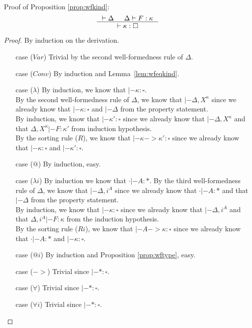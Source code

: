 \paragraph{}
Proof of Proposition \ref{prop:wfkind}:
\[ \inference{ |- \Delta & \Delta |- F : \kappa}{ |- \kappa:\square }
\]
\begin{proof} By induction on the derivation.
\begin{itemize}
\item[case] ($Var$)
	Trivial by the second well-formedness rule of $\Delta$.
\item[case] ($Conv$)
	By induction and Lemma~\ref{lem:wfeqkind}.
\item[case] ($\lambda$)
	By induction, we know that $|- \kappa:\square$.\\
	By the second well-formedness rule of $\Delta$,
	we know that $|- \Delta,X^\kappa$ since we already know
	that $|- \kappa:\square$ and $|- \Delta$ from the property statement.\\
	By induction, we know that $|- \kappa':\square$
	since we already know that $|- \Delta,X^\kappa$ and
	that $\Delta,X^\kappa|- F:\kappa'$ from induction hypothesis.\\
	By the sorting rule ($R$), we know that $|- \kappa -> \kappa':\square$
	since we already know that $|- \kappa:\square$ and $|- \kappa':\square$.
\item[case] ($@$)
	By induction, easy.
\item[case] ($\lambda i$)
	By induction we know that $\cdot|- A:*$.
	By the third well-formedness rule of $\Delta$, we know that
	$|- \Delta,i^A$ since we already know that $\cdot|- A:*$ and
	that $|- \Delta$ from the property statement.\\
	By induction, we know that $|- \kappa:\square$
	since we already know that $|- \Delta,i^A$ and
	that $\Delta,i^A|- F:\kappa$ from the induction hypothesis.\\
	By the sorting rule ($Ri$), we know that $|- A -> \kappa:\square$
	since we already know that $\cdot |- A:*$ and $|- \kappa:\square$.
\item[case] ($@i$)
	By induction and Proposition \ref{prop:wftype}, easy.
\item[case] ($->$)
	Trivial since $|- * : \square$.
\item[case] ($\forall$)
	Trivial since $|- * : \square$.
\item[case] ($\forall i$)
	Trivial since $|- * : \square$.\qedhere
\end{itemize}
\end{proof}

